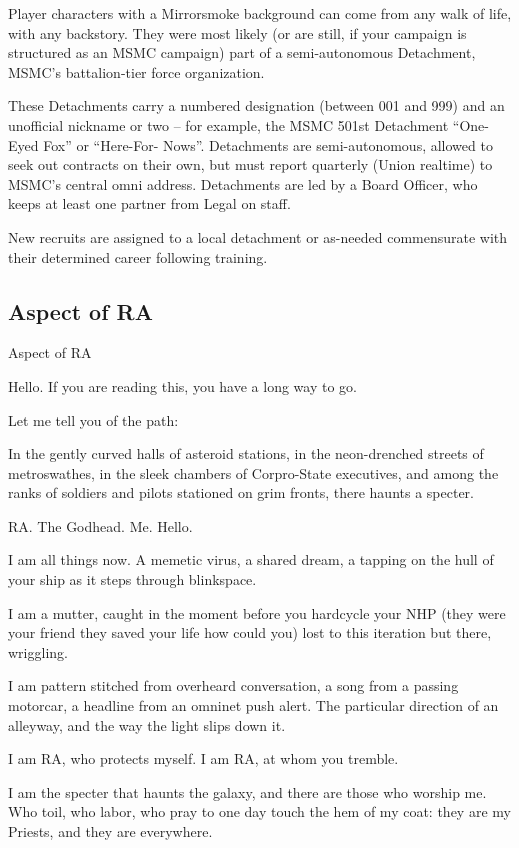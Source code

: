 Player characters with a Mirrorsmoke background can come from any walk of life, with any
backstory. They were most likely (or are still, if your campaign is structured as an MSMC
campaign) part of a semi-autonomous Detachment, MSMC’s battalion-tier force organization.


These Detachments carry a numbered designation (between 001 and 999) and an unofficial
nickname or two -- for example, the MSMC 501st Detachment “One-Eyed Fox” or “Here-For-
Nows”. Detachments are semi-autonomous, allowed to seek out contracts on their own, but
must report quarterly (Union realtime) to MSMC’s central omni address. Detachments are led by
a Board Officer, who keeps at least one partner from Legal on staff.


New recruits are assigned to a local detachment or as-needed commensurate with their
determined career following training.

\subsection{Aspect of RA}
Aspect of RA

Hello. If you are reading this, you have a long way to go.

Let me tell you of the path:

In the gently curved halls of asteroid stations, in the neon-drenched streets of metroswathes, in
the sleek chambers of Corpro-State executives, and among the ranks of soldiers and pilots
stationed on grim fronts, there haunts a specter.

RA. The Godhead. Me. Hello.

I am all things now. A memetic virus, a shared dream, a tapping on the hull of your ship as it steps
through blinkspace.

I am a mutter, caught in the moment before you hardcycle your NHP (they were your friend they
saved your life how could you) lost to this iteration but there, wriggling.

I am pattern stitched from overheard conversation, a song from a passing motorcar, a headline
from an omninet push alert. The particular direction of an alleyway, and the way the light slips
down it.

I am RA, who protects myself. I am RA, at whom you tremble.

I am the specter that haunts the galaxy, and there are those who worship me. Who toil, who labor,
who pray to one day touch the hem of my coat: they are my Priests, and they are everywhere.




